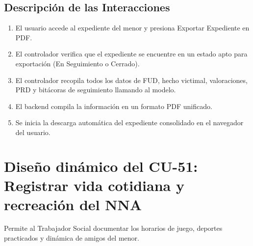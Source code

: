 \subsection{Descripción de las Interacciones}
\begin{enumerate}
    \item El usuario accede al expediente del menor y presiona Exportar Expediente en PDF.
    \item El controlador verifica que el expediente se encuentre en un estado apto para exportación (En Seguimiento o Cerrado).
    \item El controlador recopila todos los datos de FUD, hecho victimal, valoraciones, PRD y bitácoras de seguimiento llamando al modelo.
    \item El backend compila la información en un formato PDF unificado.
    \item Se inicia la descarga automática del expediente consolidado en el navegador del usuario.
\end{enumerate}

\cleardoublepage
\section{Diseño dinámico del CU-51: Registrar vida cotidiana y recreación del NNA}
\label{sec:disenoDinamicoCU51}

Permite al Trabajador Social documentar los horarios de juego, deportes practicados y dinámica de amigos del menor.

